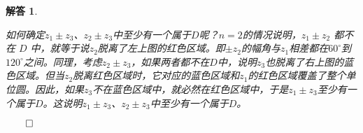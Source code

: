 \documentclass[12pt,UTF8]{ctexbook}
\theoremstyle{exercisestyle}
\theoremstyle{solutionstyle}
\newtheorem*{solution*}{解答}
\newenvironment{solution}
  {\begin{solution*}}
  {\hfill\ensuremath{\qed}\end{solution*}}
\begin{document}
\begin{solution}
\begin{subquestions}
\begin{enumerate}[label=\arabic*.]
\begin{minipage}[t]{0.4\textwidth}
\end{minipage}

如何确定\( z_1 \pm z_3 \)、\( z_2 \pm z_3 \)中至少有一个属于$D$呢？$n=2$的情况说明，\( z_1 \pm z_2 \) 都不在 \( D \) 中，就等于说$z_2$脱离了左上图的红色区域。即$\pm z_2$的幅角与$z_1$相差都在$60^\circ$到$120^\circ$之间。同理，考虑\( z_2 \pm z_3 \)，如果两者都不在$D$中，说明$z_3$也脱离了右上图的蓝色区域。但当$z_2$脱离红色区域时，它对应的蓝色区域和$z_1$的红色区域覆盖了整个单位圆。因此，如果$z_3$不在蓝色区域中，就必然在红色区域中，于是\( z_1 \pm z_3 \)至少有一个属于$D$。这说明\( z_1 \pm z_3 \)、\( z_2 \pm z_3 \)中至少有一个属于$D$。


\end{enumerate}
\end{subquestions}
\end{solution}
\end{document}
